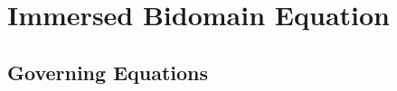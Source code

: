 \section{Immersed Bidomain Equation}
\label{sec:ImmersedBidomain}

\subsection{Governing Equations}
\label{subsec:ImmersedBidomainGoverningEquations}
